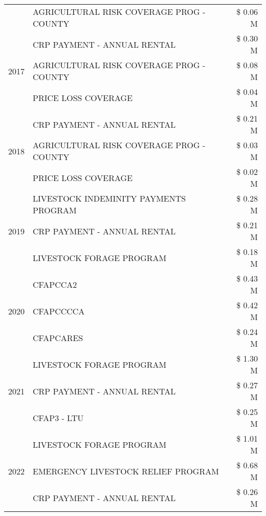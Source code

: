 \begin{tabular}{llr}
 & AGRICULTURAL RISK COVERAGE PROG - COUNTY & \$ 0.06 M \\
\cline{1-3}
\multirow[t]{3}{*}{2017} & CRP PAYMENT - ANNUAL RENTAL & \$ 0.30 M \\
 & AGRICULTURAL RISK COVERAGE PROG - COUNTY & \$ 0.08 M \\
 & PRICE LOSS COVERAGE & \$ 0.04 M \\
\cline{1-3}
\multirow[t]{3}{*}{2018} & CRP PAYMENT - ANNUAL RENTAL & \$ 0.21 M \\
 & AGRICULTURAL RISK COVERAGE PROG - COUNTY & \$ 0.03 M \\
 & PRICE LOSS COVERAGE & \$ 0.02 M \\
\cline{1-3}
\multirow[t]{3}{*}{2019} & LIVESTOCK INDEMINITY PAYMENTS PROGRAM & \$ 0.28 M \\
 & CRP PAYMENT - ANNUAL RENTAL & \$ 0.21 M \\
 & LIVESTOCK FORAGE PROGRAM & \$ 0.18 M \\
\cline{1-3}
\multirow[t]{3}{*}{2020} & CFAPCCA2 & \$ 0.43 M \\
 & CFAPCCCCA & \$ 0.42 M \\
 & CFAPCARES & \$ 0.24 M \\
\cline{1-3}
\multirow[t]{3}{*}{2021} & LIVESTOCK FORAGE PROGRAM & \$ 1.30 M \\
 & CRP PAYMENT - ANNUAL RENTAL & \$ 0.27 M \\
 & CFAP3 - LTU & \$ 0.25 M \\
\cline{1-3}
\multirow[t]{3}{*}{2022} & LIVESTOCK FORAGE PROGRAM & \$ 1.01 M \\
 & EMERGENCY LIVESTOCK RELIEF PROGRAM & \$ 0.68 M \\
 & CRP PAYMENT - ANNUAL RENTAL & \$ 0.26 M \\
\cline{1-3}
\bottomrule
\end{tabular}

